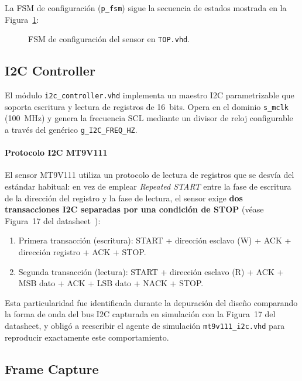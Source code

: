 \documentclass[../main.tex]{subfiles}
\begin{document}
La FSM de configuración (\texttt{p\_fsm}) sigue la secuencia de estados mostrada en la Figura~\ref{fig:fsm_top}:

\begin{figure}[htbp]
    \centering
    \caption{FSM de configuración del sensor en \texttt{TOP.vhd}.}
    \label{fig:fsm_top}
\end{figure}

\subsection{I2C Controller}
\label{sec:i2c_controller}

El módulo \texttt{i2c\_controller.vhd} implementa un maestro I2C parametrizable que soporta escritura y lectura de registros de 16~bits. Opera en el dominio \texttt{s\_mclk} (100~MHz) y genera la frecuencia SCL mediante un divisor de reloj configurable a través del genérico \texttt{g\_I2C\_FREQ\_HZ}.

\paragraph{Protocolo I2C MT9V111}

El sensor MT9V111 utiliza un protocolo de lectura de registros que se desvía del estándar habitual: en vez de emplear \textit{Repeated START} entre la fase de escritura de la dirección del registro y la fase de lectura, el sensor exige \textbf{dos transacciones I2C separadas por una condición de STOP} (véase Figura~17 del datasheet~\cite{mt9v111_datasheet}):

\begin{enumerate}
    \item Primera transacción (escritura): START + dirección esclavo (W) + ACK + dirección registro + ACK + STOP.
    \item Segunda transacción (lectura): START + dirección esclavo (R) + ACK + MSB dato + ACK + LSB dato + NACK + STOP.
\end{enumerate}

Esta particularidad fue identificada durante la depuración del diseño comparando la forma de onda del bus I2C capturada en simulación con la Figura~17 del datasheet, y obligó a reescribir el agente de simulación \texttt{mt9v111\_i2c.vhd} para reproducir exactamente este comportamiento.

\subsection{Frame Capture}
\label{sec:frame_capture}
\end{document}
